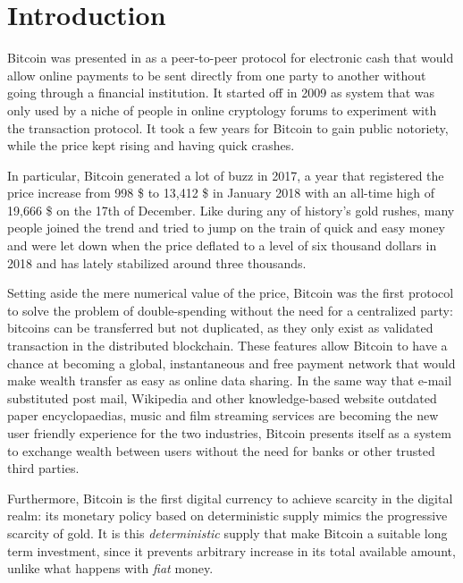 \chapter{Introduction}
\label{chpr:intro}

\bigskip



Bitcoin was presented in \citep{BTC2008} as a peer-to-peer protocol for electronic cash that would allow online payments to be sent directly from one party to another without going through a financial institution.
It started off in 2009 as system that was only used by a niche of people in online cryptology forums  to experiment with the transaction protocol. It took a few years for Bitcoin to gain public notoriety, while the price kept rising and having quick crashes. 

In particular, Bitcoin generated a lot of buzz in 2017, a year that registered the price increase from 998 \$ to 13,412 \$ in January 2018 with an all-time high of 19,666 \$ on the 17th of December. 
Like during any of history's gold rushes, many people joined the trend and tried to jump on the train  of quick and easy money and were let down when the price deflated to a level of six thousand dollars in 2018 and has lately stabilized around three thousands.

Setting aside the mere numerical value of the price, Bitcoin was the first protocol to solve the problem of double-spending without the need for a centralized party: bitcoins can be transferred but not duplicated, as they only exist as validated transaction in the distributed blockchain. 
These features allow Bitcoin to have a chance at becoming a global, instantaneous and free payment network that would make wealth transfer as easy as online data sharing.
In the same way that e-mail substituted post mail, Wikipedia and other knowledge-based website outdated paper encyclopaedias, music and film streaming services are becoming the new user friendly experience for the two industries, Bitcoin presents itself as a system to exchange wealth between users without the need for banks or other trusted third parties.

Furthermore, Bitcoin is the first digital currency to achieve scarcity in the digital realm: its monetary policy based on deterministic supply mimics the progressive scarcity of gold. It is this \textit{deterministic} supply that make Bitcoin a suitable long term investment, since it prevents arbitrary increase in its total available amount, unlike what happens with \textit{fiat} money.

